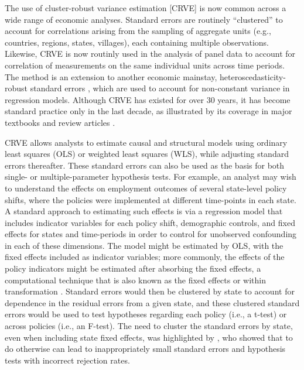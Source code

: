 \documentclass[12pt]{article}\usepackage[]{graphicx}\usepackage[]{color}
\begin{document}
The use of cluster-robust variance estimation [CRVE] \citep{Arellano1987computing, Liang1986longitudinal, white1984asymptotic} is now common across a wide range of economic analyses.
Standard errors are routinely ``clustered'' to account for correlations arising from the sampling of aggregate units (e.g., countries, regions, states, villages), each containing multiple observations. 
Likewise, CRVE is now routinly used in the analysis of panel data to account for correlation of measurements on the same individual units across time periods. 
The method is an extension to another economic mainstay, heteroscedasticity-robust standard errors \citep{eicker1967limit, Huber1967behavior, White1980heteroskedasticity}, which are used to account for non-constant variance in regression models. 
Although CRVE has existed for over 30 years, it has become standard practice only in the last decade, as illustrated by its coverage in major textbooks and review articles \citep[e.g.,][]{Wooldridge2010econometric, Angrist2009mostly, Cameron2015practitioners}.

CRVE allows analysts to estimate causal and structural models using ordinary least squares (OLS) or weighted least squares (WLS), while adjusting standard errors thereafter.
These standard errors can also be used as the basis for both single- or multiple-parameter hypothesis tests.
For example, an analyst may wish to understand the effects on employment outcomes of several state-level policy shifts, where the policies were implemented at different time-points in each state. 
A standard approach to estimating such effects is via a regression model that includes indicator variables for each policy shift, demographic controls, and fixed effects for states and time-periods in order to control for unobserved confounding in each of these dimensions. 
The model might be estimated by OLS, with the fixed effects included as indicator variables; more commonly, the effects of the policy indicators might be estimated after absorbing the fixed effects, a computational technique that is also known as the fixed effects or within transformation \citep{Wooldridge2010econometric}. 
Standard errors would then be clustered by state to account for dependence in the residual errors from a given state, and these clustered standard errors would be used to test hypotheses regarding each policy (i.e., a t-test) or across policies (i.e., an F-test).
The need to cluster the standard errors by state, even when including state fixed effects, was highlighted by \citet{Bertrand2004how}, who showed that to do otherwise can lead to inappropriately small standard errors and hypothesis tests with incorrect rejection rates. 
\end{document}
